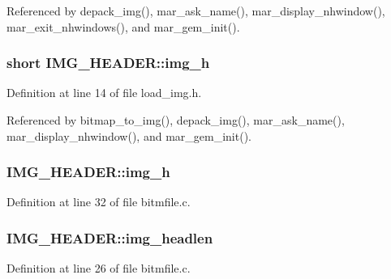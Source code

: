 Referenced by depack\+\_\+img(), mar\+\_\+ask\+\_\+name(), mar\+\_\+display\+\_\+nhwindow(), mar\+\_\+exit\+\_\+nhwindows(), and mar\+\_\+gem\+\_\+init().

\hypertarget{structIMG__HEADER_aeae05d69855fcda61b9d2e9f5e7aec32}{
\subsubsection[{img\+\_\+h}]{\setlength{\rightskip}{0pt plus 5cm}short I\+M\+G\+\_\+\+H\+E\+A\+D\+E\+R\+::img\+\_\+h}}\label{structIMG__HEADER_aeae05d69855fcda61b9d2e9f5e7aec32}


Definition at line 14 of file load\+\_\+img.\+h.



Referenced by bitmap\+\_\+to\+\_\+img(), depack\+\_\+img(), mar\+\_\+ask\+\_\+name(), mar\+\_\+display\+\_\+nhwindow(), and mar\+\_\+gem\+\_\+init().

\hypertarget{structIMG__HEADER_a7d50a3aca8261f67064db57bbe0d6d06}{
\subsubsection[{img\+\_\+h}]{ I\+M\+G\+\_\+\+H\+E\+A\+D\+E\+R\+::img\+\_\+h}}\label{structIMG__HEADER_a7d50a3aca8261f67064db57bbe0d6d06}


Definition at line 32 of file bitmfile.\+c.

\hypertarget{structIMG__HEADER_ab069cc485851b9af26104d9618f14468}{
\subsubsection[{img\+\_\+headlen}]{ I\+M\+G\+\_\+\+H\+E\+A\+D\+E\+R\+::img\+\_\+headlen}}\label{structIMG__HEADER_ab069cc485851b9af26104d9618f14468}


Definition at line 26 of file bitmfile.\+c.



